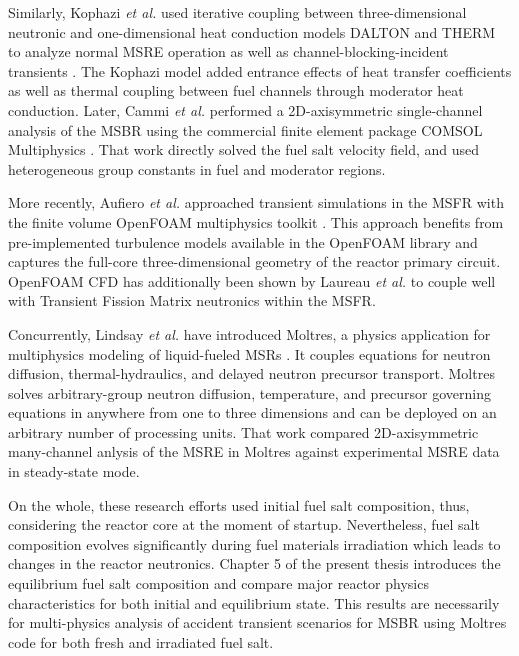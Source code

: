 Similarly, Kophazi \emph{et al.} used iterative coupling between three-dimensional neutronic and one-dimensional heat conduction models DALTON and THERM to analyze normal \gls{MSRE} operation as well as channel-blocking-incident transients \cite{kophazi_development_2009}. The Kophazi model added entrance effects of heat transfer coefficients as well as thermal coupling between fuel channels through moderator heat conduction. Later, Cammi \emph{et al.} performed a 2D-axisymmetric single-channel analysis of the \gls{MSBR} using the commercial finite element package COMSOL Multiphysics \cite{cammi_multi-physics_2011}. That work directly solved the fuel salt velocity field, and used heterogeneous group constants in fuel and moderator regions.  

More recently, Aufiero \emph{et al.} \cite{aufiero_development_2014} approached transient simulations in the \gls{MSFR} with the finite volume OpenFOAM multiphysics toolkit \cite{weller_tensorial_1998}.  This approach benefits from pre-implemented turbulence models available in the OpenFOAM library and captures the full-core three-dimensional geometry of the reactor primary circuit.  OpenFOAM \gls{CFD} has additionally been shown by Laureau \emph{et al.} \cite{laureau_transient_2017} to couple well with Transient Fission Matrix neutronics within the \gls{MSFR}.

Concurrently, Lindsay \emph{et al.} have introduced Moltres, a physics application for multiphysics modeling of liquid-fueled \glspl{MSR} \cite{lindsay_introduction_2018}. It couples equations for neutron diffusion, thermal-hydraulics, and delayed neutron precursor transport. Moltres solves arbitrary-group neutron diffusion, temperature, and precursor governing equations in anywhere from one to three dimensions and can be deployed on an arbitrary number of processing units. That work compared 2D-axisymmetric many-channel anlysis of the \gls{MSRE} in Moltres against experimental \gls{MSRE} data in steady-state mode.

On the whole, these research efforts used initial fuel salt composition, thus, considering the reactor core at the moment of startup. Nevertheless, fuel salt composition evolves significantly during fuel materials irradiation which leads to changes in the reactor neutronics. Chapter 5 of the present thesis introduces the equilibrium fuel salt composition and compare major reactor physics characteristics for both initial and equilibrium state. This results are necessarily for multi-physics analysis of accident transient scenarios for \gls{MSBR} using Moltres code for both fresh and irradiated fuel salt.

